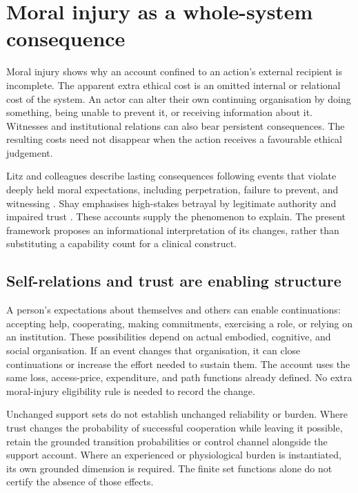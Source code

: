 \documentclass[11pt,a4paper]{article}
\theoremstyle{remark}
\begin{document}
\section{Moral injury as a whole-system consequence}\label{sec:moral-injury}

Moral injury shows why an account confined to an action's external recipient
is incomplete. The apparent extra ethical cost is an omitted internal or
relational cost of the system. An actor can alter their own continuing organisation by doing
something, being unable to prevent it, or receiving information about it.
Witnesses and institutional relations can also bear persistent consequences.
The resulting costs need not disappear when the action receives a favourable
ethical judgement.

Litz and colleagues describe lasting consequences following events that violate
deeply held moral expectations, including perpetration, failure to prevent, and
witnessing \citep{litz2009moralinjury}. Shay emphasises high-stakes betrayal by
legitimate authority and impaired trust \citep{shay2014moralinjury}. These accounts
supply the phenomenon to explain. The present framework proposes an
informational interpretation of its changes, rather than substituting a
capability count for a clinical construct.

\subsection{Self-relations and trust are enabling structure}

A person's expectations about themselves and others can enable continuations:
accepting help, cooperating, making commitments, exercising a role, or relying
on an institution. These possibilities depend on actual embodied, cognitive,
and social organisation. If an event changes that organisation, it can close
continuations or increase the effort needed to sustain them. The account uses
the same loss, access-price, expenditure, and path functions already defined.
No extra moral-injury eligibility rule is needed to record the change.

Unchanged support sets do not establish unchanged reliability or burden. Where
trust changes the probability of successful cooperation while leaving it possible,
retain the grounded transition probabilities or control channel alongside the
support account. Where an experienced or physiological burden is instantiated,
its own grounded dimension is required. The finite set functions alone do not
certify the absence of those effects.
\end{document}
